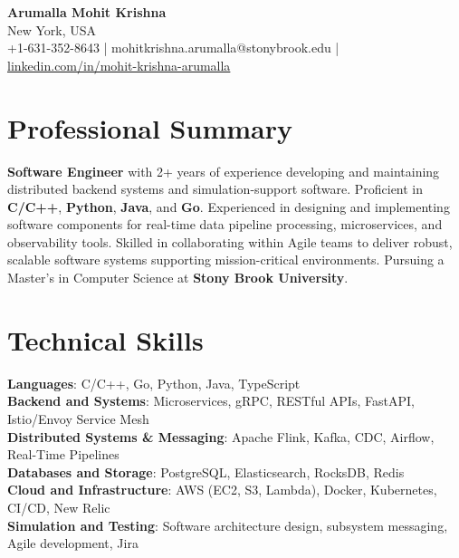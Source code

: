 \documentclass[letterpaper,11pt]{article}
\begin{document}
\begin{center}
  {\Large \textbf{Arumalla Mohit Krishna}} \\
  New York, USA \\
  +1-631-352-8643 \enspace | \enspace mohitkrishna.arumalla@stonybrook.edu \enspace | \enspace \href{https://www.linkedin.com/in/mohit-krishna-arumalla}{linkedin.com/in/mohit-krishna-arumalla}
\end{center}

\section{Professional Summary}
  \begin{itemize}[leftmargin=0.15in, label={}]
    \small{\item{
     \textbf{Software Engineer} with 2+ years of experience developing and maintaining distributed backend systems and simulation-support software. Proficient in \textbf{C/C++}, \textbf{Python}, \textbf{Java}, and \textbf{Go}. Experienced in designing and implementing software components for real-time data pipeline processing, microservices, and observability tools. Skilled in collaborating within Agile teams to deliver robust, scalable software systems supporting mission-critical environments. Pursuing a Master’s in Computer Science at \textbf{Stony Brook University}.
    }}
  \end{itemize}
\vspace{-16pt}

\section{Technical Skills}
 \begin{itemize}[leftmargin=0.15in, label={}]
    \small{\item{
     \textbf{Languages}: C/C++, Go, Python, Java, TypeScript \\
     \textbf{Backend and Systems}: Microservices, gRPC, RESTful APIs, FastAPI, Istio/Envoy Service Mesh \\
     \textbf{Distributed Systems \& Messaging}: Apache Flink, Kafka, CDC, Airflow, Real-Time Pipelines \\
     \textbf{Databases and Storage}: PostgreSQL, Elasticsearch, RocksDB, Redis \\
     \textbf{Cloud and Infrastructure}: AWS (EC2, S3, Lambda), Docker, Kubernetes, CI/CD, New Relic \\
     \textbf{Simulation and Testing}: Software architecture design, subsystem messaging, Agile development, Jira
    }}
 \end{itemize}
\vspace{-16pt}
\end{document}
